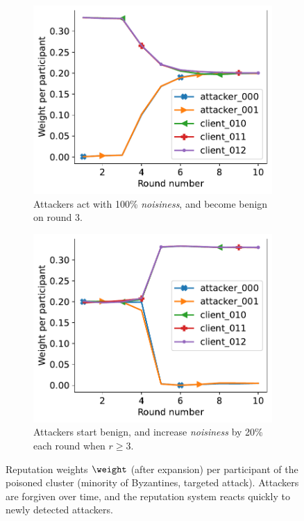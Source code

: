 
\begin{figure}[!t] %
  \centering 
  \begin{subfigure}[t]{.47\linewidth}
    \centering 
    \includegraphics[trim=0 0 10pt 0,clip,width=\linewidth]{figures/reput/redemption_byzantine_min.pdf}    
    \caption{
      Attackers act with 100\% \emph{noisiness}, and become benign on round 3.
    }
    \label{fig:redemption_byzantine_min}
  \end{subfigure}
  \quad
  \begin{subfigure}[t]{.47\linewidth}
    \centering 
    \includegraphics[trim=0 0 10pt 0,clip,width=\linewidth]{figures/reput/increment_byzantine_min.pdf}
    \caption{
      Attackers start benign, and increase \emph{noisiness} by 20\% each round when $r\geq3$.
    }
    \label{fig:increment_byzantine_min}
  \end{subfigure}
  \caption{
    Reputation weights $\weight$ (after expansion) per participant of the poisoned cluster (minority of Byzantines, targeted attack).
    Attackers are forgiven over time, and the reputation system reacts quickly to newly detected attackers.
  }
  \label{fig:redemption_decrease}

\end{figure}
